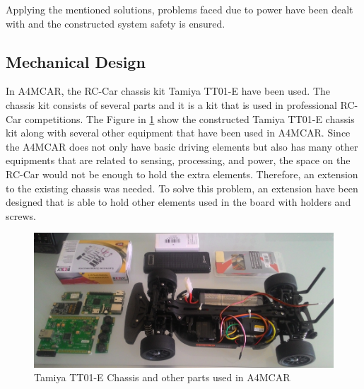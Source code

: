 Applying the mentioned solutions, problems faced due to power have been dealt with and the constructed system safety is ensured.

\subsection{Mechanical Design}
In A4MCAR, the RC-Car chassis kit Tamiya TT01-E \cite{tt01e} have been used. The chassis kit consists of several parts and it is a kit that is used in professional RC-Car competitions. The Figure in \ref{fig:rccarparts} show the constructed Tamiya TT01-E chassis kit along with several other equipment that have been used in A4MCAR. Since the A4MCAR does not only have basic driving elements but also has many other equipments that are related to sensing, processing, and power, the space on the RC-Car would not be enough to hold the extra elements. Therefore, an extension to the existing chassis was needed. To solve this problem, an extension have been designed that is able to hold other elements used in the board with holders and screws. 
\begin{figure}[!ht]
	\includegraphics[scale=0.45]{content/images/rccarparts.png}
	\caption{Tamiya TT01-E Chassis and other parts used in A4MCAR}
	\label{fig:rccarparts}
\end{figure}

